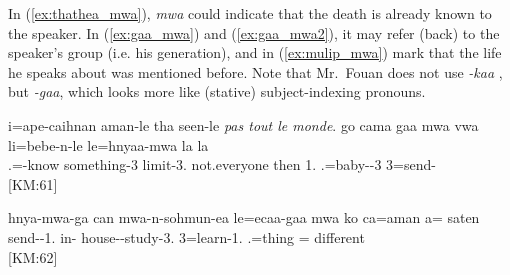 In (\ref{ex:thathea_mwa}), \textit{mwa} could indicate that the death is already known to the speaker. In (\ref{ex:gaa_mwa}) and (\ref{ex:gaa_mwa2}), it may refer (back) to the speaker's group (i.e. his generation), and in (\ref{ex:mulip_mwa}) mark that the life he speaks about was mentioned before. Note that Mr.\ Fouan does not use \textit{-kaa} , but \textit{-gaa}, which looks more like (stative) subject-indexing pronouns.


%
% 

\ea\label{ex:gaa_mwa}
\gll i=ape-caihnan aman-le tha seen-le \textit{pas tout le monde}. go cama gaa {mwa} vwa li=bebe-n-le le=hnyaa-mwa la la	\\
 .=-know something-3	 limit-3. not.everyone then  1.   .=baby--3 3=send-  \\
\glt {} {[KM:61]}
      \z

\ea\label{ex:gaa_mwa2}
\gll hnya-mwa-ga can mwa-n-sohmun-ea le=ecaa-gaa {mwa} ko ca=aman a= saten\\
  send--1. in- house--study-3. 3=learn-1.   .=thing = different\\
\glt {} {[KM:62]}
\z

%
%

